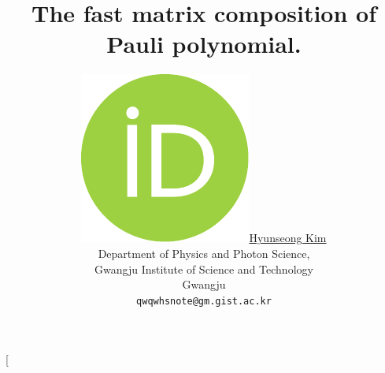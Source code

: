 \documentclass[twocolumn]{article}
\title{The fast matrix composition of Pauli polynomial.
}
\author{
    \href{https://orcid.org/0000-0002-4876-7820}{
        \includegraphics[scale=0.06]{orcid.pdf}\hspace{1mm}Hyunseong Kim}\\
  Department of Physics and Photon Science,  \\
  Gwangju Institute of Science and Technology\\
  Gwangju\\
  \texttt{qwqwhsnote@gm.gist.ac.kr} \\
}
\begin{document}
\twocolumn[ 
\begin{@twocolumnfalse}
    \begin{center}

    \maketitle

\begin{abstract}




\end{abstract}
\end{center}
\end{@twocolumnfalse}
\end{document}
